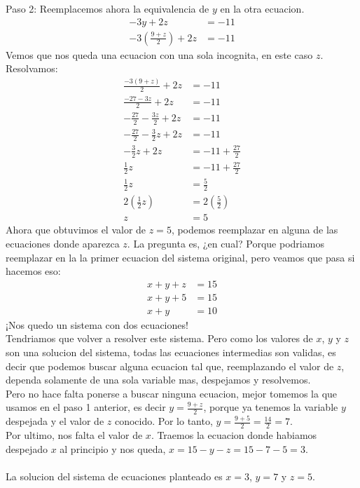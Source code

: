 \documentclass{article}
\begin{document}
\begin{ejemplo}
\begin{normalsize}
Paso 2: Reemplacemos ahora la equivalencia de $y$ en la otra ecuacion.
\begin{align}
	-3y+2z&=-11\nonumber\\
	-3(\frac{9+z}{2})+2z&=-11\nonumber
\end{align}
Vemos que nos queda una ecuacion con una sola incognita, en este caso $z$. Resolvamos:
\begin{align}
	\frac{-3(9+z)}{2}+2z&=-11\nonumber\\
	\frac{-27-3z}{2}+2z&=-11\nonumber\\
	-\frac{27}{2}-\frac{3z}{2}+2z&=-11\nonumber\\
	-\frac{27}{2}-\frac{3}{2}z+2z&=-11\nonumber\\
	-\frac{3}{2}z+2z&=-11+\frac{27}{2}\nonumber\\
	\frac{1}{2}z&=-11+\frac{27}{2}\nonumber\\
	\frac{1}{2}z&=\frac{5}{2}\nonumber\\
	2(\frac{1}{2}z)&=2(\frac{5}{2})\nonumber\\
	z&=5\nonumber
\end{align}
Ahora que obtuvimos el valor de $z=5$, podemos reemplazar en alguna de las ecuaciones donde aparezca $z$. La pregunta es, ¿en cual? Porque podriamos reemplazar en la la primer ecuacion del sistema original, pero veamos que pasa si hacemos eso:
\begin{align}
	x+y+z&=15\nonumber\\
	x+y+5&=15\nonumber\\
	x+y&=10\nonumber
\end{align}
¡Nos quedo un sistema con dos ecuaciones!\\
Tendriamos que volver a resolver este sistema. Pero como los valores de $x$, $y$ y $z$ son una solucion del sistema, todas las ecuaciones intermedias son validas, es decir que podemos buscar alguna ecuacion tal que, reemplazando el valor de $z$, dependa solamente de una sola variable mas, despejamos y resolvemos.\\
Pero no hace falta ponerse a buscar ninguna ecuacion, mejor tomemos la que usamos en el paso 1 anterior, es decir $y=\frac{9+z}{2}$, porque ya tenemos la variable $y$ despejada y el valor de $z$ conocido. Por lo tanto, $y=\frac{9+5}{2}=\frac{14}{2}=7$.\\
Por ultimo, nos falta el valor de $x$. Traemos la ecuacion donde habiamos despejado $x$ al principio y nos queda, $x=15-y-z=15-7-5=3$.\\\\
La solucion del sistema de ecuaciones planteado es $x=3$, $y=7$ y $z=5$.
\end{normalsize}
\end{ejemplo}
\end{document}

